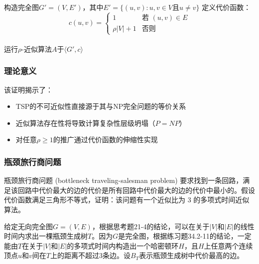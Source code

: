 \documentclass[./../main.tex]{subfiles} %
\begin{document}
\begin{algorithm}[H]
\caption{TSP不可近似性的归约过程}
\SetAlgoLined
{}
\BlankLine
构造完全图$G'=(V,E')$，其中$E'=\{(u,v):u,v\in V \text{且} u\neq v\}$\;
定义代价函数：
$$
c(u,v) = 
\begin{cases}
1 & \text{若 } (u,v)\in E \\
\rho|V|+1 & \text{否则}
\end{cases}
$$ \\
运行$\rho$-近似算法$A$于$\langle G',c\rangle$\;
\BlankLine
{}
\end{algorithm}

\subsubsection*{理论意义}
该证明揭示了：
\begin{itemize}
    \item TSP的不可近似性直接源于其与NP完全问题的等价关系
    \item 近似算法存在性将导致计算复杂性层级坍塌（$P=NP$）
    \item 对任意$\rho\geq 1$的推广通过代价函数的伸缩性实现
\end{itemize}

\subsubsection{瓶颈旅行商问题}
瓶颈旅行商问题 (bottleneck traveling-salesman problem) 要求找到一条回路，满足该回路中代价最大的边的代价是所有回路中代价最大的边的代价中最小的。假设代价函数满足三角形不等式，证明：该问题有一个近似比为 3 的多项式时间近似算法。

给定无向完全图$G=(V,E)$，根据思考题21-4的结论，可以在关于$|V|$和$|E|$的线性时间内求出一棵瓶颈生成树$T$。因为$G$是完全图，根据练习题34.2-11的结论，一定能由$T$在关于$|V|$和$|E|$的多项式时间内构造出一个哈密顿环$H$，且$H$上任意两个连续顶点$u$和$v$间在$T$上的距离不超过3条边。设$B_T$表示瓶颈生成树中代价最高的边。
\end{document}
